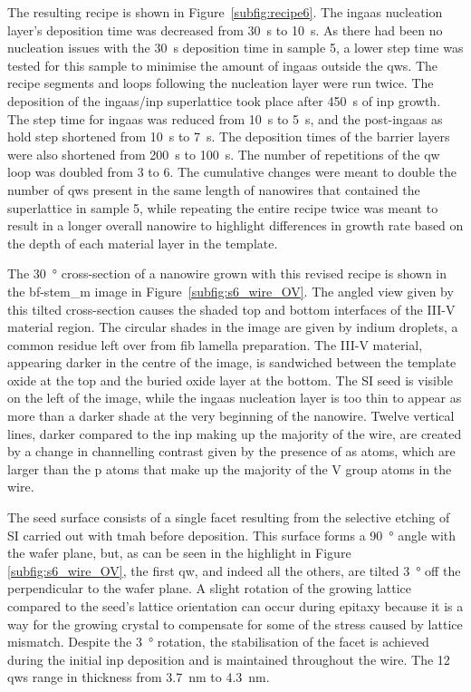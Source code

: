 The resulting recipe is shown in Figure~\ref{subfig:recipe6}. The \acs{ingaas} nucleation layer's deposition time was decreased from \qty{30}{\second} to \qty{10}{\second}. As there had been no nucleation issues with the \qty{30}{\second} deposition time in sample 5, a lower step time was tested for this sample to minimise the amount of \acs{ingaas} outside the \acl{qw}s. The recipe segments and loops following the nucleation layer were run twice. The deposition of the \acs{ingaas}/\acs{inp} superlattice took place after \qty{450}{\second} of \acs{inp} growth. The step time for \acs{ingaas} was reduced from \qty{10}{\second} to \qty{5}{\second}, and the post-\acs{ingaas} \acl{as} hold step shortened from \qty{10}{\second} to \qty{7}{\second}. The deposition times of the barrier layers were also shortened from \qty{200}{\second} to \qty{100}{\second}. The number of repetitions of the \acl{qw} loop was doubled from \num{3} to \num{6}. The cumulative changes were meant to double the number of \acl{qw}s present in the same length of nanowires that contained the superlattice in sample 5, while repeating the entire recipe twice was meant to result in a longer overall nanowire to highlight differences in growth rate based on the depth of each material layer in the template.

The \qty{30}{\degree} cross-section of a nanowire grown with this revised recipe is shown in the \acs{bf}-\acs{stem_m} image in Figure~\ref{subfig:s6_wire_OV}. The angled view given by this tilted cross-section causes the shaded top and bottom interfaces of the III-V material region. The circular shades in the image are given by indium droplets, a common residue left over from \acs{fib} lamella preparation. The III-V material, appearing darker in the centre of the image, is sandwiched between the template oxide at the top and the buried oxide layer at the bottom. The \acl{SI} seed is visible on the left of the image, while the \acs{ingaas} nucleation layer is too thin to appear as more than a darker shade at the very beginning of the nanowire. Twelve vertical lines, darker compared to the \acs{inp} making up the majority of the wire, are created by a change in channelling contrast given by the presence of \acl{as} atoms, which are larger than the \acl{p} atoms that make up the majority of the V group atoms in the wire.

The seed surface consists of a single  facet resulting from the selective etching of \acl{SI} carried out with \acs{tmah} before deposition. This surface forms a \qty{90}{\degree} angle with the wafer plane, but, as can be seen in the highlight in Figure \ref{subfig:s6_wire_OV}, the first \acl{qw}, and indeed all the others, are tilted \qty{3}{\degree} off the perpendicular to the wafer plane. A slight rotation of the growing lattice compared to the seed's lattice orientation can occur during epitaxy because it is a way for the growing crystal to compensate for some of the stress caused by lattice mismatch. Despite the \qty{3}{\degree} rotation, the stabilisation of the  facet is achieved during the initial \acs{inp} deposition and is maintained throughout the wire. The \num{12} \acl{qw}s range in thickness from \qty{3.7}{\nano\metre} to \qty{4.3}{\nano\metre}.

